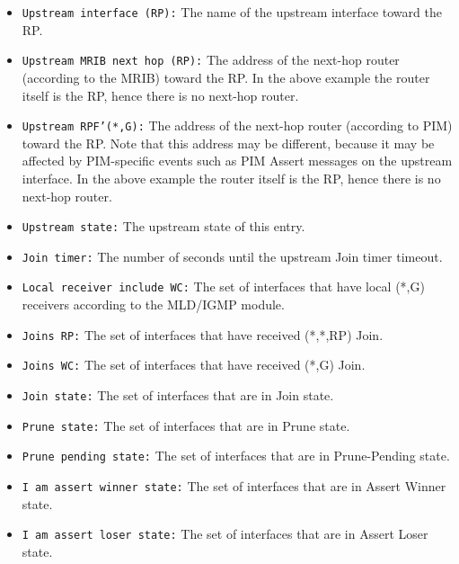 \begin{itemize}

  \item {\tt Upstream interface (RP):} The name of the upstream interface
  toward the RP.

  \item {\tt Upstream MRIB next hop (RP):} The address of the next-hop router
  (according to the MRIB) toward the RP. In the above example the router
  itself is the RP, hence there is no next-hop router.

  \item {\tt Upstream RPF'(*,G):} The address of the next-hop router
  (according to PIM) toward the RP. Note that this address may be different,
  because it may be affected by PIM-specific events such as PIM Assert
  messages on the upstream interface. In the above example the router
  itself is the RP, hence there is no next-hop router.

  \item {\tt Upstream state:} The upstream state of this entry.

  \item {\tt Join timer:} The number of seconds until the upstream Join
  timer timeout.

  \item {\tt Local receiver include WC:} The set of interfaces that
  have local (*,G) receivers according to the MLD/IGMP module.

  \item {\tt Joins RP:} The set of interfaces that have received (*,*,RP)
  Join.

  \item {\tt Joins WC:} The set of interfaces that have received (*,G) Join.

  \item {\tt Join state:} The set of interfaces that are in Join state.

  \item {\tt Prune state:} The set of interfaces that are in Prune state.

  \item {\tt Prune pending state:} The set of interfaces that are in
  Prune-Pending state.

  \item {\tt I am assert winner state:} The set of interfaces that are in
  Assert Winner state.

  \item {\tt I am assert loser state:} The set of interfaces that are in
  Assert Loser state.


\end{itemize}
